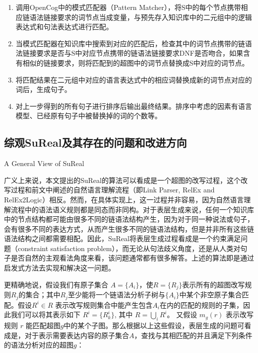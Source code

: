\begin{itemize}
\begin{enumerate}
\item 调用OpenCog中的模式匹配器（Pattern Matcher），将S中的每个节点携带相应链语法链接要求的词节点当成变量，与预先存入知识库中的二元组中的逻辑表达式和句法表达式进行匹配。

\item  当模式匹配器在知识库中搜索到对应的匹配后，检查其中的词节点携带的链语法链接要求是否与S中对应节点携带的链语法链接要求DNF是否吻合，如果含有相似的链接要求，则将匹配到的超图中的词节点替换成S中对应的词节点。

\item 将匹配结果在二元组中对应的语言表达式中的相应词替换成新的词节点对应的词后，生成句子。

\item 对上一步得到的所有句子进行排序后输出最终结果。排序中考虑的因素有语言模型、已经原有句子中被替换掉的词的个数等。

\end{enumerate}
\end{itemize}


\subsection{综观SuReal及其存在的问题和改进方向}{A General View of SuReal}

广义上来说，本文提出的SuReal的算法可以看成是一个超图的改写过程，这个改写过程和前文中阐述的自然语言理解流程（即Link Parser, RelEx and RelEx2Logic）相反。然而，在具体实现上，这一过程并非容易，因为自然语言理解流程中的语法语义规则都是同态而非同构。对于表层生成来说，任何一个知识库中的节点结构都可能由很多不同的链语法结构产生，因为对于同一种说法或句子，会有很多不同的表达方式，从而产生很多不同的链语法结构，但是并非所有这些链语法结构之间都需要相配。因此，SuReal将表层生成过程看成是一个约束满足问题（constraint satisfaction problem），而无论从句法歧义角度，还是从人类对句子是否自然的主观看法角度来看，该问题通常都有很多解答。上述的算法即是通过启发式方法去实现和解决这一问题。


更精确地说，假设我们有原子集合 $A = \{A_i\}$，使$R = \{ R_{j} \}$表示所有的超图改写规则$R_j$的集合；其中$R_j$至少能将一个链语法分析子树与$\{A_i\}$中某个非空原子集合匹配。假设$R^i \in R$ 表示改写规则集合中能产生包含$A_i$在内的匹配的规则的子集，因此我们可以将其表示如下 $R^i = \{R^i_k\}$, 其中 $R = \bigcup_i R^i$。 又假设 $m_g(r )$ 表示改写规则 $r$ 能匹配超图$g$中的某个子图。那么根据以上这些假设，表层生成的问题可看成是，对于表示需要表达内容的原子集合$A$，查找与其相匹配的并且满足下列条件的语法分析对应的超图$g$：

